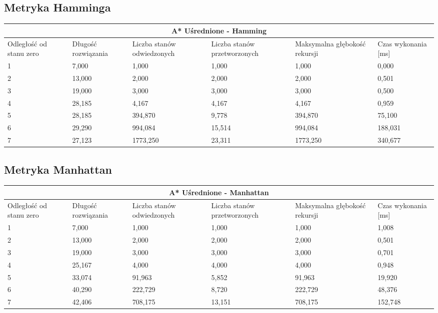\documentclass{classrep}
\begin{document}
{\subsection{Metryka Hamminga}
\begin{center}
	\begin{tabular}{ | p{1.6cm} | p{1.4cm} | p{1.8cm} | p{2cm} | p{2.2cm} | p{2cm} | }
	\hline
	\multicolumn{6}{|c|}{A* Uśrednione - Hamming} \\
	\hline
	Odległość od stanu zero & Długość rozwiązania & Liczba stanów odwiedzonych & Liczba stanów przetworzonych & Maksymalna głębokość rekursji & Czas wykonania [ms]\\
	\hline
	1&7,000&1,000&1,000&1,000&0,000 \\
	\hline
	2&13,000&2,000&2,000&2,000&0,501\\
	\hline
	3 &19,000&3,000&3,000&3,000&0,500\\
	\hline
	4 &28,185&4,167&4,167&4,167&0,959\\
	\hline
	5 &28,185&394,870&9,778&394,870&75,100\\
	\hline
	6&29,290&994,084&15,514&994,084&188,031\\
	\hline
	7 &27,123&1773,250&23,311&1773,250&340,677\\
	\hline
	\end{tabular}
\end{center}

\subsection{Metryka Manhattan}
\begin{center}
	\begin{tabular}{ | p{1.6cm} | p{1.4cm} | p{1.8cm} | p{2cm} | p{2.2cm} | p{2cm} | }
	\hline
	\multicolumn{6}{|c|}{A* Uśrednione - Manhattan} \\
	\hline
	Odległość od stanu zero & Długość rozwiązania & Liczba stanów odwiedzonych & Liczba stanów przetworzonych & Maksymalna głębokość rekursji & Czas wykonania [ms]\\
	\hline
	1&7,000&1,000&1,000&1,000&1,008 \\
	\hline
	2&13,000&2,000&2,000&2,000&0,501\\
	\hline
	3 &19,000&3,000&3,000&3,000&0,701\\
	\hline
	4& 25,167&4,000&4,000&4,000&0,948\\
	\hline
	5& 33,074&91,963&5,852&91,963&19,920\\
	\hline
	6& 40,290&222,729&8,720&222,729&48,376\\
	\hline
	7& 42,406&708,175&13,151&708,175&152,748\\	
	\hline
	\end{tabular}
\end{center}
}
\end{document}
